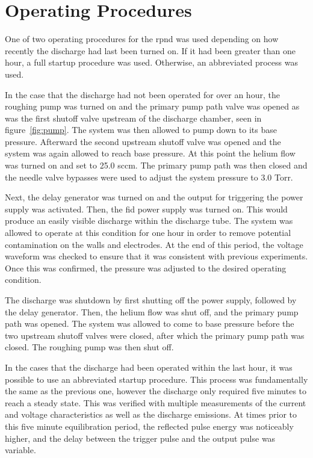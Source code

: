 \section{Operating Procedures}

One of two operating procedures for the \acs{rpnd} was used depending on how
recently the discharge had last been turned on. If it had been greater than one
hour, a full startup procedure was used. Otherwise, an abbreviated process was
used.

In the case that the discharge had not been operated for over an hour, the
roughing pump was turned on and the primary pump path valve was opened as was
the first shutoff valve upstream of the discharge chamber, seen in
figure~\ref{fig:pump}. The system was then allowed to pump down to its base
pressure. Afterward the second upstream shutoff valve was opened and the system
was again allowed to reach base pressure. At this point the helium flow was
turned on and set to 25.0 sccm. The primary pump path was then closed and the
needle valve bypasses were used to adjust the system pressure to 3.0 Torr.

Next, the delay generator was turned on and the output for triggering the power
supply was activated. Then, the \acs{fid} power supply was turned on. This would
produce an easily visible discharge within the discharge tube. The system was
allowed to operate at this condition for one hour in order to remove potential
contamination on the walls and electrodes. At the end of this period, the
voltage waveform was checked to ensure that it was consistent with previous
experiments. Once this was confirmed, the pressure was adjusted to the desired
operating condition.

The discharge was shutdown by first shutting off the power supply, followed by
the delay generator. Then, the helium flow was shut off, and the primary pump
path was opened. The system was allowed to come to base pressure before the two
upstream shutoff valves were closed, after which the primary pump path was
closed. The roughing pump was then shut off.

In the cases that the discharge had been operated within the last hour, it was
possible to use an abbreviated startup procedure. This process was fundamentally
the same as the previous one, however the discharge only required five minutes
to reach a steady state. This was verified with multiple measurements of the
current and voltage characteristics as well as the discharge emissions. At times
prior to this five minute equilibration period, the reflected pulse energy was
noticeably higher, and the delay between the trigger pulse and the output pulse
was variable.

